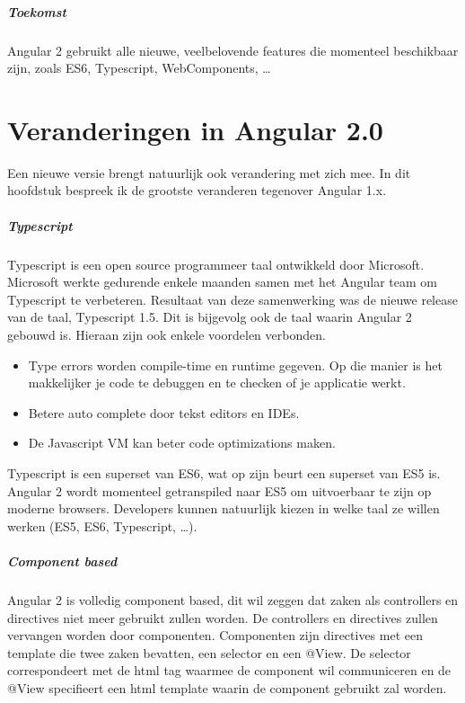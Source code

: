 \documentclass[pdftex,a4paper,12pt,twoside]{report}
\begin{document}
\paragraph{Toekomst} 
Angular 2 gebruikt alle nieuwe, veelbelovende features die momenteel beschikbaar zijn, zoals ES6, Typescript, WebComponents, \ldots
\par


\chapter{Veranderingen in Angular 2.0}
\label{ch:veranderingen}
Een nieuwe versie brengt natuurlijk ook verandering met zich mee. In dit hoofdstuk bespreek ik de grootste veranderen tegenover Angular 1.x.

\paragraph{Typescript}
Typescript is een open source programmeer taal ontwikkeld door Microsoft. Microsoft werkte gedurende enkele maanden samen met het Angular team om Typescript te verbeteren. Resultaat van deze samenwerking was de nieuwe release van de taal, Typescript 1.5. Dit is bijgevolg ook de taal waarin Angular 2 gebouwd is. Hieraan zijn ook enkele voordelen verbonden.  

\begin{itemize}
    	\item Type errors worden compile-time en runtime gegeven. Op die manier is het makkelijker je code te debuggen en te checken of je applicatie werkt.
	\item Betere auto complete door tekst editors en IDEs.
	\item De Javascript VM kan beter code optimizations maken.
\end{itemize}

Typescript is een superset van ES6, wat op zijn beurt een superset van ES5 is. Angular 2 wordt momenteel getranspiled naar ES5 om uitvoerbaar te zijn op moderne browsers. Developers kunnen natuurlijk kiezen in welke taal ze willen werken (ES5, ES6, Typescript, \ldots).
\par

\paragraph{Component based}
Angular 2 is volledig component based, dit wil zeggen dat zaken als controllers en directives niet meer gebruikt zullen worden. De controllers en directives zullen vervangen worden door componenten. Componenten zijn directives met een template die twee zaken bevatten, een selector en een @View. De selector correspondeert met de html tag waarmee de component wil communiceren en de @View specifieert een html template waarin de component gebruikt zal worden.
\par
\end{document}
